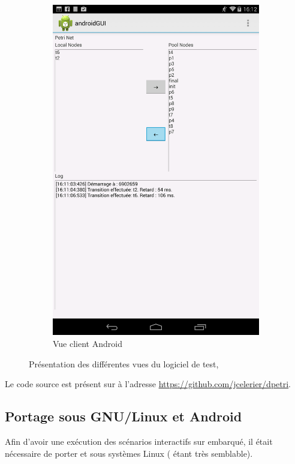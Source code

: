 \begin{figure}[H]
	\begin{subfigure}{.5\textwidth}
		\centering
		\includegraphics[scale=0.16]{images/dpetriAndroid.png}
		\caption{Vue client Android}
	\end{subfigure}
	
	\caption{Présentation des différentes vues du logiciel de test, }
	\label{fig.dpetri}
\end{figure}

Le code source est présent sur  à l'adresse \url{https://github.com/jcelerier/dpetri}.

\subsection{Portage sous GNU/Linux et Android}
Afin d'avoir une exécution des scénarios interactifs sur embarqué, il était nécessaire de porter  et  sous systèmes Linux ( étant très semblable).

